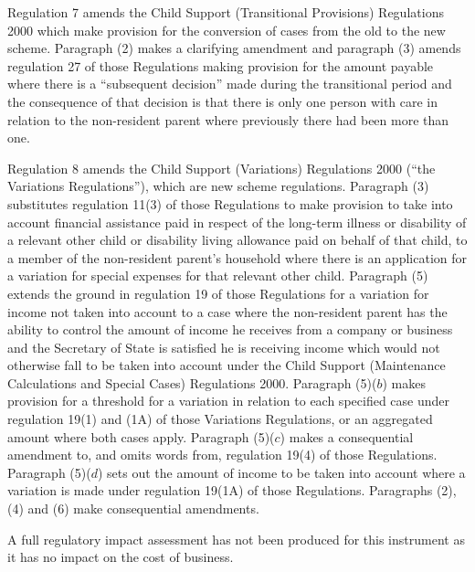 \documentclass[12pt,a4paper]{article}
\begin{document}
Regulation 7 amends the Child Support (Transitional Provisions) Regulations 2000 which make provision for the conversion of cases from the old to the new scheme. Paragraph (2) makes a clarifying amendment and paragraph (3) amends regulation 27 of those Regulations making provision for the amount payable where there is a “subsequent decision” made during the transitional period and the consequence of that decision is that there is only one person with care in relation to the non-resident parent where previously there had been more than one.

Regulation 8 amends the Child Support (Variations) Regulations 2000 (“the Variations Regulations”), which are new scheme regulations. Paragraph (3) substitutes regulation 11(3) of those Regulations to make provision to take into account financial assistance paid in respect of the long-term illness or disability of a relevant other child or disability living allowance paid on behalf of that child, to a member of the non-resident parent’s household where there is an application for a variation for special expenses for that relevant other child. Paragraph (5) extends the ground in regulation 19 of those Regulations for a variation for income not taken into account to a case where the non-resident parent has the ability to control the amount of income he receives from a company or business and the Secretary of State is satisfied he is receiving income which would not otherwise fall to be taken into account under the Child Support (Maintenance Calculations and Special Cases) Regulations 2000. Paragraph (5)($b$)  makes provision for a threshold for a variation in relation to each specified case under regulation 19(1) and (1A) of those Variations Regulations, or an aggregated amount where both cases apply. Paragraph (5)($c$)  makes a consequential amendment to, and omits words from, regulation 19(4) of those Regulations. Paragraph (5)($d$)  sets out the amount of income to be taken into account where a variation is made under regulation 19(1A) of those Regulations. Paragraphs (2), (4) and (6) make consequential amendments.

A full regulatory impact assessment has not been produced for this instrument as it has no impact on the cost of business. 
\end{document}
